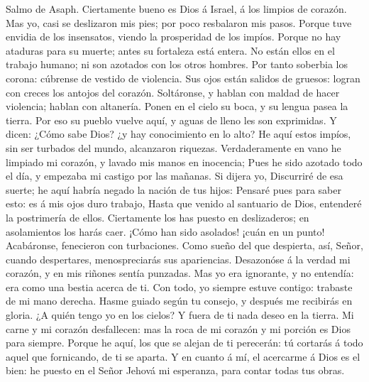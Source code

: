  Salmo de Asaph. Ciertamente bueno es Dios á Israel, á los
limpios de corazón.  Mas yo, casi se deslizaron mis pies;
por poco resbalaron mis pasos.  Porque tuve envidia de los
insensatos, viendo la prosperidad de los impíos.  Porque
no hay ataduras para su muerte; antes su fortaleza está entera.
 No están ellos en el trabajo humano; ni son azotados con
los otros hombres.  Por tanto soberbia los corona:
cúbrense de vestido de violencia.  Sus ojos están salidos
de gruesos: logran con creces los antojos del corazón. 
Soltáronse, y hablan con maldad de hacer violencia; hablan con
altanería.  Ponen en el cielo su boca, y su lengua pasea
la tierra.  Por eso su pueblo vuelve aquí, y aguas de
lleno les son exprimidas.  Y dicen: ¿Cómo sabe Dios? ¿y
hay conocimiento en lo alto?  He aquí estos impíos, sin
ser turbados del mundo, alcanzaron riquezas. 
Verdaderamente en vano he limpiado mi corazón, y lavado mis manos en
inocencia;  Pues he sido azotado todo el día, y empezaba
mi castigo por las mañanas.  Si dijera yo, Discurriré de
esa suerte; he aquí habría negado la nación de tus hijos:
 Pensaré pues para saber esto: es á mis ojos duro
trabajo,  Hasta que venido al santuario de Dios,
entenderé la postrimería de ellos.  Ciertamente los has
puesto en deslizaderos; en asolamientos los harás caer. 
¡Cómo han sido asolados! ¡cuán en un punto! Acabáronse, fenecieron con
turbaciones.  Como sueño del que despierta, así, Señor,
cuando despertares, menospreciarás sus apariencias. 
Desazonóse á la verdad mi corazón, y en mis riñones sentía punzadas.
 Mas yo era ignorante, y no entendía: era como una bestia
acerca de ti.  Con todo, yo siempre estuve contigo:
trabaste de mi mano derecha.  Hasme guiado según tu
consejo, y después me recibirás en gloria.  ¿A quién
tengo yo en los cielos? Y fuera de ti nada deseo en la tierra.
 Mi carne y mi corazón desfallecen: mas la roca de mi
corazón y mi porción es Dios para siempre.  Porque he
aquí, los que se alejan de ti perecerán: tú cortarás á todo aquel que
fornicando, de ti se aparta.  Y en cuanto á mí, el
acercarme á Dios es el bien: he puesto en el Señor Jehová mi esperanza,
para contar todas tus obras.

